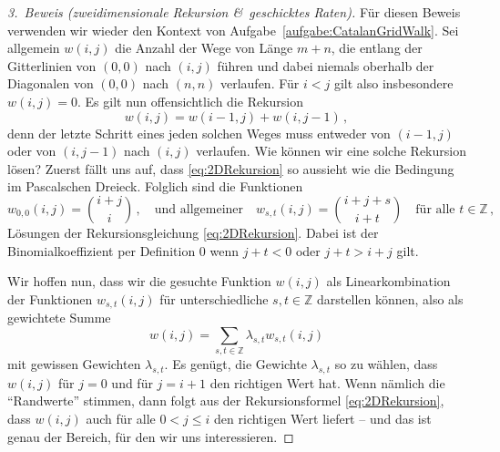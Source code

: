 \begin{proof}[3.\ Beweis \textmd{(zweidimensionale Rekursion \&\ geschicktes Raten)}]
	Für diesen Beweis verwenden wir wieder den Kontext von Aufgabe~\ref{aufgabe:CatalanGridWalk}. Sei allgemein $w(i,j)$ die Anzahl der Wege von Länge $m+n$, die entlang der Gitterlinien von $(0,0)$ nach $(i,j)$ führen und dabei niemals oberhalb der Diagonalen von $(0,0)$ nach $(n,n)$ verlaufen. Für $i<j$ gilt also insbesondere $w(i,j)=0$. Es gilt nun offensichtlich die Rekursion
	\begin{equation*}\label{eq:2DRekursion}
		w(i,j)=w(i-1,j)+w(i,j-1)\,,\tag{$*$}
	\end{equation*}
	denn der letzte Schritt eines jeden solchen Weges muss entweder von $(i-1,j)$ oder von $(i,j-1)$ nach $(i,j)$ verlaufen. Wie können wir eine solche Rekursion lösen? Zuerst fällt uns auf, dass \eqref{eq:2DRekursion} so aussieht wie die Bedingung im Pascalschen Dreieck. Folglich sind die Funktionen
	\begin{equation*}
		w_{0,0}(i,j)=\binom{i+j}{i}\,,\quad\text{und allgemeiner}\quad w_{s,t}(i,j)=\binom{i+j+s}{i+t}\quad\text{für alle }t\in\mathbb Z\,,
	\end{equation*}
	Lösungen der Rekursionsgleichung \eqref{eq:2DRekursion}. Dabei ist der Binomialkoeffizient per Definition $0$ wenn $j+t<0$ oder $j+t>i+j$ gilt. 
	
	Wir hoffen nun, dass wir die gesuchte Funktion $w(i,j)$ als Linearkombination der Funktionen $w_{s,t}(i,j)$  für unterschiedliche $s,t\in\mathbb Z$ darstellen können, also als gewichtete Summe
	\begin{equation*}
		w(i,j)=\sum_{s,t\in\mathbb Z}\lambda_{s,t}w_{s,t}(i,j)
	\end{equation*}
	mit gewissen Gewichten $\lambda_{s,t}$. Es genügt, die Gewichte $\lambda_{s,t}$ so zu wählen, dass $w(i,j)$ für $j=0$ und für $j=i+1$ den richtigen Wert hat. Wenn nämlich die \enquote{Randwerte} stimmen, dann folgt aus der Rekursionsformel \eqref{eq:2DRekursion}, dass $w(i,j)$ auch für alle $0<j\leqslant i$ den richtigen Wert liefert -- und das ist genau der Bereich, für den wir uns interessieren.
	

\end{proof}
